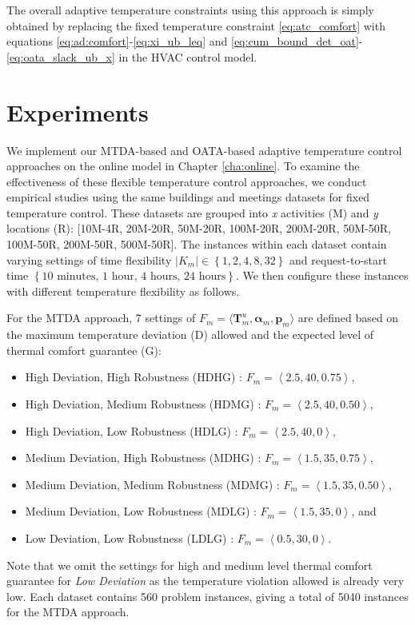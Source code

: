 The overall adaptive temperature constraints using this approach is simply obtained by replacing the fixed temperature constraint \eqref{eq:atc_comfort} with equations \eqref{eq:ad:comfort}-\eqref{eq:xi_ub_leq} and \eqref{eq:cum_bound_det_oat}-\eqref{eq:oata_slack_ub_x} in the HVAC control model.


\section{Experiments} \label{sec:atc_exp}

We implement our MTDA-based and OATA-based adaptive temperature control approaches on the online model in Chapter \ref{cha:online}. To examine the effectiveness of these flexible temperature control approaches, we conduct empirical studies using the same buildings and meetings datasets for fixed temperature control. %
These datasets are grouped into \textsl{x} activities (M) and \textsl{y} locations (R): [10M-4R, 20M-20R, 50M-20R, 100M-20R, 200M-20R, 50M-50R, 100M-50R, 200M-50R, 500M-50R]. 
The instances within each dataset contain varying settings of time flexibility $\left|K_m\right| \in \left\{1,2,4,8,32\right\}$ and request-to-start time $\left\{\mbox{10 minutes, 1 hour, 4 hours, 24 hours}\right\}$.
We then configure these instances with different temperature flexibility as follows.

For the MTDA approach, 7 settings of $F_m=\langle {\bm T}^{u}_m, {\bm \alpha}_m, {\bm p}_m\rangle$ are defined based on the maximum temperature deviation (D) allowed and the expected level of thermal comfort guarantee (G):
\begin{itemize}	
	\item High Deviation, High Robustness (HDHG) : $F_m=\left\langle 2.5, 40, 0.75\right\rangle$,
	\item High Deviation, Medium Robustness (HDMG) : $F_m=\left\langle 2.5, 40, 0.50\right\rangle$,
	\item High Deviation, Low Robustness (HDLG) : $F_m=\left\langle 2.5, 40, 0\right\rangle$,
	\item Medium Deviation, High Robustness (MDHG) : $F_m=\left\langle 1.5, 35, 0.75\right\rangle$,
	\item Medium Deviation, Medium Robustness (MDMG) : $F_m=\left\langle 1.5, 35, 0.50\right\rangle$,
	\item Medium Deviation, Low Robustness (MDLG) : $F_m=\left\langle 1.5, 35, 0\right\rangle$, and
	\item Low Deviation, Low Robustness (LDLG) : $F_m=\left\langle 0.5, 30, 0\right\rangle$.	
\end{itemize}
Note that we omit the settings for high and medium level thermal comfort guarantee for \textsl{Low Deviation} as the temperature violation allowed is already very low. Each dataset contains 560 problem instances, giving a total of 5040 instances for the MTDA approach.

